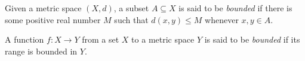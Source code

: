 \documentclass[12pt]{article}
\begin{document}
Given a metric space $(X, d)$, a subset $A\subseteq X$ is said to be \emph{bounded} if there is some positive real number $M$ such that $d(x, y)\leq M$ whenever $x, y \in A$.

A function $f : X \rightarrow Y$ from a set $X$ to a metric space $Y$ is said to be \emph{bounded} if its range is bounded in $Y$.
\end{document}
